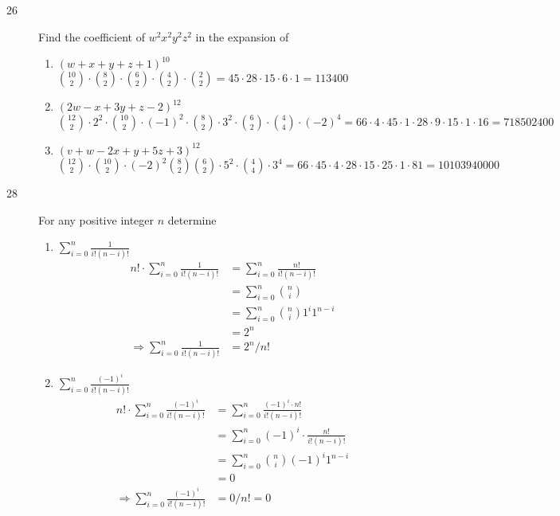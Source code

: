 \documentclass[a4paper]{article}
\begin{document}
\begin{description}
\item[26]
Find the coefficient of $w^2x^2y^2z^2$ in the expansion of
    \begin{enumerate}[label=\alph*)]
      \item $(w+x+y+z+1)^{10}$\\
      $\binom{10}{2}\cdot\binom{8}{2}\cdot\binom{6}{2}\cdot\binom{4}{2}\cdot\binom{2}{2}=45\cdot 28\cdot 15\cdot 6\cdot 1=113400$
      \item $(2w-x+3y+z-2)^{12}$\\
      $\binom{12}{2}\cdot2^2\cdot\binom{10}{2}\cdot(-1)^2\cdot\binom{8}{2}\cdot3^2\cdot\binom{6}{2}\cdot\binom{4}{4}\cdot(-2)^4=66\cdot4\cdot 45\cdot 1\cdot 28\cdot 9\cdot 15\cdot 1\cdot 16=718502400$
      \item $(v+w-2x+y+5z+3)^{12}$\\
      $\binom{12}{2}\cdot\binom{10}{2}\cdot(-2)^2\binom{8}{2}\binom{6}{2}\cdot5^2\cdot\binom{4}{4}\cdot3^4=66\cdot 45\cdot 4\cdot 28\cdot 15\cdot 25\cdot 1 \cdot 81=10103940000$
    \end{enumerate}

\item[28]
For any positive integer $n$ determine
    \begin{enumerate}[label=\alph*)]
      \item $\sum_{i=0}^n\frac{1}{i!(n-i)!}$
        \begin{align*}
            n!\cdot \sum_{i=0}^n\frac{1}{i!(n-i)!}  & = \sum_{i=0}^n\frac{n!}{i!(n-i)!} \\
            & = \sum_{i=0}^n\binom{n}{i} \\
            & = \sum_{i=0}^n\binom{n}{i}1^i1^{n-i} \\
            & = 2^n\\
            \Rightarrow\sum_{i=0}^n\frac{1}{i!(n-i)!}& = 2^n/n!
        \end{align*}
      \item $\sum_{i=0}^n\frac{(-1)^i}{i!(n-i)!}$
        \begin{align*}
            n!\cdot \sum_{i=0}^n\frac{(-1)^i}{i!(n-i)!}  & = \sum_{i=0}^n\frac{(-1)^i\cdot n!}{i!(n-i)!} \\
            & = \sum_{i=0}^n (-1)^i\cdot\frac{n!}{i!(n-i)!} \\
            & = \sum_{i=0}^n\binom{n}{i}(-1)^i1^{n-i} \\
            & = 0\\
            \Rightarrow\sum_{i=0}^n\frac{(-1)^i}{i!(n-i)!}& = 0/n!=0
        \end{align*}
    \end{enumerate}
\end{description}
\end{document}
